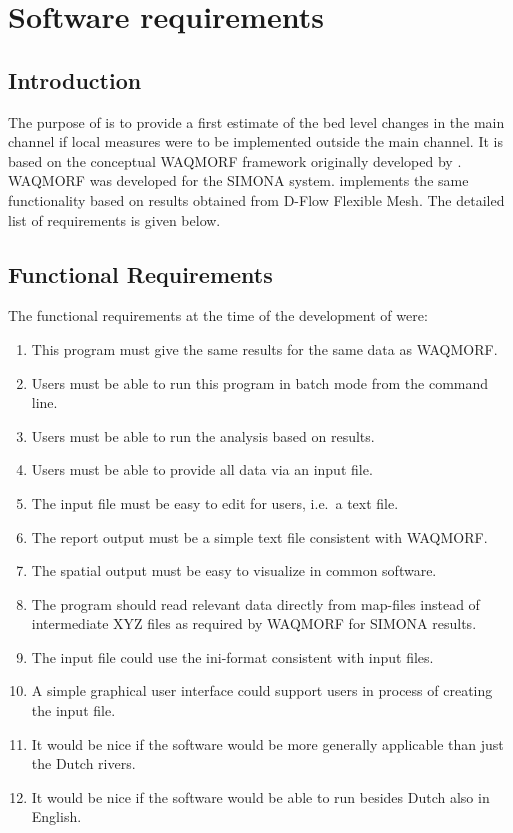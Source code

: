 \chapter{Software requirements}

\section{Introduction}

The purpose of \dfastmi is to provide a first estimate of the bed level changes in the main channel if local measures were to be implemented outside the main channel.
It is based on the conceptual WAQMORF framework originally developed by \citet{Sieben2008}.
WAQMORF was developed for the SIMONA system.
\dfastmi implements the same functionality based on results obtained from D-Flow Flexible Mesh.
The detailed list of requirements is given below.

\section{Functional Requirements} \label{Sec:FuncReq}

The functional requirements at the time of the development of  were:

\begin{enumerate}
\item This program must give the same results for the same data as WAQMORF.
\item Users must be able to run this program in batch mode from the command line.
\item Users must be able to run the analysis based on \dflowfm results.
\item Users must be able to provide all data via an input file.
\item The input file must be easy to edit for users, i.e.~a text file.
\item The report output must be a simple text file consistent with WAQMORF.
\item The spatial output must be easy to visualize in common software.

\item The program should read relevant data directly from \dflowfm map-files instead of intermediate XYZ files as required by WAQMORF for SIMONA results.

\item The input file could use the ini-format consistent with \dflowfm input files.
\item A simple graphical user interface could support users in process of creating the input file.

\item It would be nice if the software would be more generally applicable than just the Dutch rivers.
\item It would be nice if the software would be able to run besides Dutch also in English.
\end{enumerate}

